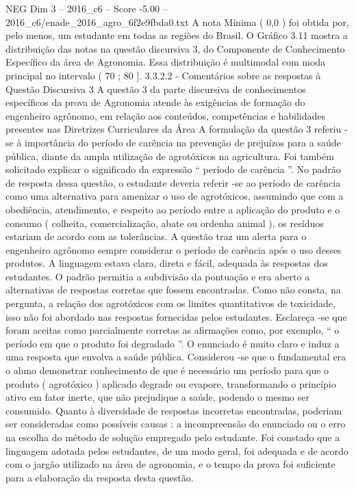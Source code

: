 \begin{textsample}{NEG Dim 3 – 2016\_c6 – Score -5.00 – 2016\_c6/enade\_2016\_agro\_6f2e9fbda0.txt}
A nota Mínima ( 0,0 ) foi obtida por, pelo menos, um estudante em todas as regiões do Brasil.
O Gráfico 3.11 mostra a distribuição das notas na questão discursiva 3, do Componente de Conhecimento Específico da área de Agronomia.
Essa distribuição é multimodal com moda principal no intervalo ( 70 ; 80 ]. 3.3.2.2 - Comentários sobre as respostas à Questão Discursiva 3 A questão 3 da parte discursiva de conhecimentos específicos da prova de Agronomia atende às exigências de formação do engenheiro agrônomo, em relação aos conteúdos, competências e habilidades presentes nas Diretrizes Curriculares da Área A formulação da questão 3 referiu -se à importância do período de carência na prevenção de prejuízos para a saúde pública, diante da ampla utilização de agrotóxicos na agricultura.
Foi também solicitado explicar o significado da expressão “ período de carência ”.
No padrão de resposta dessa questão, o estudante deveria referir -se ao período de carência como uma alternativa para amenizar o uso de agrotóxicos, assumindo que com a obediência, atendimento, e respeito ao período entre a aplicação do produto e o consumo ( colheita, comercialização, abate ou ordenha animal ), os resíduos estariam de acordo com as tolerâncias.
A questão traz um alerta para o engenheiro agrônomo sempre considerar o período de carência após o uso desses produtos.
A linguagem estava clara, direta e fácil, adequada às respostas dos estudantes.
O padrão permitia a subdivisão da pontuação e era aberto a alternativas de respostas corretas que fossem encontradas.
Como não consta, na pergunta, a relação dos agrotóxicos com os limites quantitativos de toxicidade, isso não foi abordado nas respostas fornecidas pelos estudantes.
Esclareça -se que foram aceitas como parcialmente corretas as afirmações como, por exemplo, “ o período em que o produto foi degradado ”.
O enunciado é muito claro e induz a uma resposta que envolva a saúde pública.
Considerou -se que o fundamental era o aluno demonstrar conhecimento de que é necessário um período para que o produto ( agrotóxico ) aplicado degrade ou evapore, transformando o princípio ativo em fator inerte, que não prejudique a saúde, podendo o mesmo ser consumido.
Quanto à diversidade de respostas incorretas encontradas, poderiam ser consideradas como possíveis causas : a incompreensão do enunciado ou o erro na escolha do método de solução empregado pelo estudante.
Foi constado que a linguagem adotada pelos estudantes, de um modo geral, foi adequada e de acordo com o jargão utilizado na área de agronomia, e o tempo da prova foi suficiente para a elaboração da resposta desta questão.

\end{textsample}
